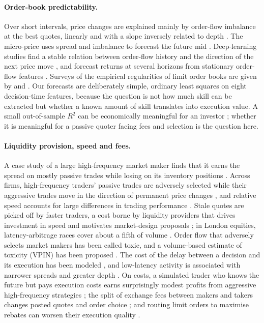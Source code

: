 \documentclass[11pt]{article}
\begin{document}
\paragraph{Order-book predictability.} Over short intervals, price changes are explained mainly by order-flow imbalance at
the best quotes, linearly and with a slope inversely related to depth \citep{cont2014}. The micro-price uses spread and
imbalance to forecast the future mid \citep{stoikov2018}. Deep-learning studies find a stable relation between order-flow
history and the direction of the next price move \citep{sirignano2019}, and forecast returns at several horizons from
stationary order-flow features \citep{kolm2023}. Surveys of the empirical regularities of limit order books are given by
\citet{gould2013} and \citet{bouchaud2018}. Our forecasts are deliberately simple, ordinary least squares on eight
decision-time features, because the question is not how much skill can be extracted but whether a known amount of
skill translates into execution value. A small out-of-sample $R^2$ can be economically meaningful for an investor
\citep{campbell2008}; whether it is meaningful for a passive quoter facing fees and selection is the question here.

\paragraph{Liquidity provision, speed and fees.} A case study of a large high-frequency market maker finds that it earns
the spread on mostly passive trades while losing on its inventory positions \citep{menkveld2013}. Across firms, high-frequency
traders' passive trades are adversely selected while their aggressive trades move in the direction of permanent price
changes \citep{brogaard2014}, and relative speed accounts for large differences in trading performance
\citep{baron2019}. Stale quotes are picked off by faster traders, a cost borne by liquidity providers that drives
investment in speed and motivates market-design proposals \citep{foucault2003,budish2015,foucault2017}; in London
equities, latency-arbitrage races cover about a fifth of volume \citep{aquilina2022}. Order flow that adversely selects
market makers has been called toxic, and a volume-based estimate of toxicity (VPIN) has been proposed \citep{easley2012}. The cost of the delay between a decision and
its execution has been modeled \citep{moallemi2013}, and low-latency activity is associated with narrower spreads and
greater depth \citep{hasbrouck2013}. On costs, a simulated trader who knows the future but pays execution costs earns
surprisingly modest profits from aggressive high-frequency strategies \citep{kearns2010}; the split of exchange fees between makers and takers
changes posted quotes and order choice \citep{malinova2015}; and routing limit orders to maximise rebates can worsen their
execution quality \citep{battalio2016}.
\end{document}
